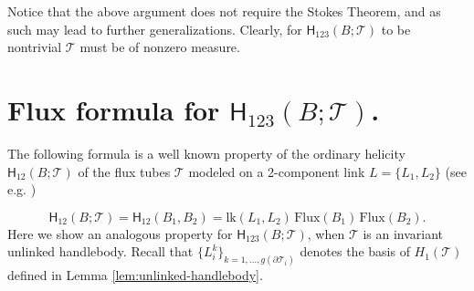 \documentclass[12pt]{article}
\numberwithin{equation}{section}
\newcommand{\no}{\noindent}
\begin{document}
\no Notice that the above argument does not require the Stokes Theorem, and as such may lead to further generalizations. Clearly, for $\mathsf{H}_{123}(B;\mathcal{T})$ to be nontrivial $\mathcal{T}$ must be 
of nonzero measure.




\section{Flux formula for  \texorpdfstring{$\mathsf{H}_{123}(B;\mathcal{T})$}{H-123}.}

 The following formula is a well known property of the ordinary helicity $\mathsf{H}_{12}(B;\mathcal{T})$ of the flux tubes $\mathcal{T}$ modeled on a 2-component link $L=\{L_1,L_2\}$ (see e.g. \cite{Laurence-Avellaneda93, Cantarella00})

\begin{equation}\label{eq:helicity12-flux-tubes}
\mathsf{H}_{12}(B;\mathcal{T})=\mathsf{H}_{12}(B_1,B_2)=\text{lk}(L_1,L_2)\,\text{Flux}(B_1)\,\text{Flux}(B_2).
\end{equation}
\no Here we show an analogous property for $\mathsf{H}_{123}(B;\mathcal{T})$, when $\mathcal{T}$ is  an invariant unlinked  handlebody. Recall that $\{L^k_i\}_{k=1,\ldots,g(\partial\mathcal{T}_i)}$ denotes the basis of $H_1(\mathcal{T})$ defined in Lemma \ref{lem:unlinked-handlebody}.
\end{document}
